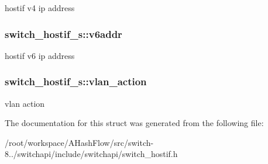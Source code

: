 hostif v4 ip address \hypertarget{structswitch__hostif__s_ac6b227eeabbc17456154b14ab3644bb7}{
\subsubsection[{v6addr}]{ switch\+\_\+hostif\+\_\+s\+::v6addr}}\label{structswitch__hostif__s_ac6b227eeabbc17456154b14ab3644bb7}
hostif v6 ip address \hypertarget{structswitch__hostif__s_a963a45b780889ea85ae87e15b002281b}{
\subsubsection[{vlan\+\_\+action}]{ switch\+\_\+hostif\+\_\+s\+::vlan\+\_\+action}}\label{structswitch__hostif__s_a963a45b780889ea85ae87e15b002281b}
vlan action 

The documentation for this struct was generated from the following file\+:\begin{DoxyCompactItemize}
\item 
/root/workspace/\+A\+Hash\+Flow/src/switch-\/8../switchapi/include/switchapi/switch\+\_\+hostif.\+h\end{DoxyCompactItemize}
